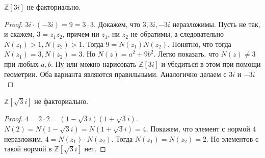 \documentclass{article}
\begin{document}
\begin{statement}
    $\mathbb{Z}[3i]$ не факториально.
\end{statement}

\begin{proof}
    $3i \cdot (-3i) = 9 = 3 \cdot 3$. Докажем, что $3, 3i, -3i$ неразложимы. Пусть не так, и скажем, $3 = z_1 z_2$,
    причем ни $z_1$, ни $z_2$ не обратимы, а следовательно $N(z_1) > 1, N(z_2) > 1$.
    Тогда $9 = N(z_1) N(z_2)$. Понятно, что тогда $N(z_1) = 3, N(z_2) = 3$. Но $N(z) = a^2 + 9b^2$. Легко показать, что
    $N(z) \neq 3$ при любых $a, b$. Ну или можно нарисовать $\mathbb{Z}[3i]$ и убедиться в этом при помощи геометрии.
    Оба варианта являются правильными. Аналогично делаем с $3i$ и $-3i$
\end{proof}

\begin{statement}
    $\mathbb{Z}[\sqrt{3}i]$ не факториально.
\end{statement}

\begin{proof}
    $4 = 2 \cdot 2 = (1 - \sqrt{3}i)(1 + \sqrt{3}i)$. $N(2) = N(1 - \sqrt{3}i) = N(1 + \sqrt{3}i) = 4$. Покажем, что
    элемент с нормой 4 неразложим. $4 = N(z_1) \cdot N(z_2)$. Тогда $N(z_1) = N(z_2) = 2$. Но элементов с такой нормой в
    $\mathbb{Z}[\sqrt{3}i]$ нет.
\end{proof}
\end{document}
